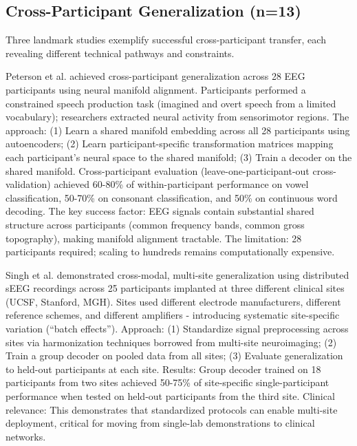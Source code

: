 \subsection{Cross-Participant Generalization (n=13)}

Three landmark studies exemplify successful cross-participant transfer, each revealing different technical pathways and constraints.

Peterson et al. \cite{Peterson2021} achieved cross-participant generalization across 28 EEG participants using neural manifold alignment. Participants performed a constrained speech production task (imagined and overt speech from a limited vocabulary); researchers extracted neural activity from sensorimotor regions. The approach: (1) Learn a shared manifold embedding across all 28 participants using autoencoders; (2) Learn participant-specific transformation matrices mapping each participant's neural space to the shared manifold; (3) Train a decoder on the shared manifold. Cross-participant evaluation (leave-one-participant-out cross-validation) achieved 60-80\% of within-participant performance on vowel classification, 50-70\% on consonant classification, and 50\% on continuous word decoding. The key success factor: EEG signals contain substantial shared structure across participants (common frequency bands, common gross topography), making manifold alignment tractable. The limitation: 28 participants required; scaling to hundreds remains computationally expensive.

Singh et al. \cite{Singh2025} demonstrated cross-modal, multi-site generalization using distributed sEEG recordings across 25 participants implanted at three different clinical sites (UCSF, Stanford, MGH). Sites used different electrode manufacturers, different reference schemes, and different amplifiers - introducing systematic site-specific variation (``batch effects''). Approach: (1) Standardize signal preprocessing across sites via harmonization techniques borrowed from multi-site neuroimaging; (2) Train a group decoder on pooled data from all sites; (3) Evaluate generalization to held-out participants at each site. Results: Group decoder trained on 18 participants from two sites achieved 50-75\% of site-specific single-participant performance when tested on held-out participants from the third site. Clinical relevance: This demonstrates that standardized protocols can enable multi-site deployment, critical for moving from single-lab demonstrations to clinical networks.

